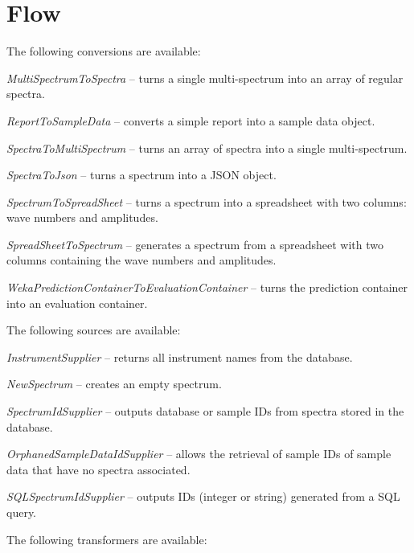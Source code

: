 \documentclass[a4paper]{book}
\begin{document}
\chapter{Flow}
The following conversions are available:
\begin{tight_itemize}
  \item \textit{MultiSpectrumToSpectra} -- turns a single multi-spectrum
  into an array of regular spectra.
  \item \textit{ReportToSampleData} -- converts a simple report into
  a sample data object.
  \item \textit{SpectraToMultiSpectrum} -- turns an array of spectra
  into a single multi-spectrum.
  \item \textit{SpectraToJson} -- turns a spectrum into a JSON object.
  \item \textit{SpectrumToSpreadSheet} -- turns a spectrum into a spreadsheet
  with two columns: wave numbers and amplitudes.
  \item \textit{SpreadSheetToSpectrum} -- generates a spectrum from a spreadsheet
  with two columns containing the wave numbers and amplitudes.
  \item \textit{WekaPredictionContainerToEvaluationContainer} -- turns the
  prediction container into an evaluation container.
\end{tight_itemize}
The following sources are available:
\begin{tight_itemize}
  \item \textit{InstrumentSupplier} -- returns all instrument names from the
  database.
  \item \textit{NewSpectrum} -- creates an empty spectrum.
  \item \textit{SpectrumIdSupplier} -- outputs database or sample IDs from spectra
  stored in the database.
  \item \textit{OrphanedSampleDataIdSupplier} -- allows the retrieval of sample
  IDs of sample data that have no spectra associated.
  \item \textit{SQLSpectrumIdSupplier} -- outputs IDs (integer or string)
  generated from a SQL query.
\end{tight_itemize}
The following transformers are available:
\end{document}
